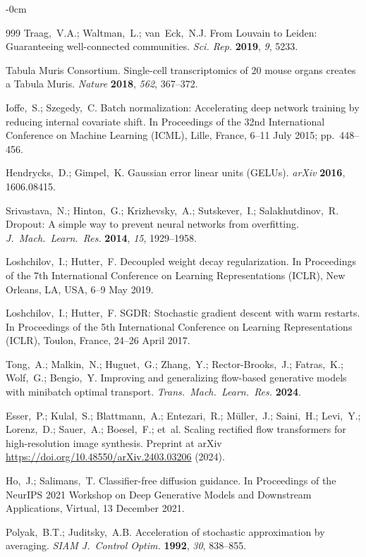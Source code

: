 \documentclass[11pt,a4paper]{article}
\newlength{\extralength}
\begin{document}
\begin{adjustwidth}{-\extralength}{0cm}
\begin{thebibliography}{999}
Traag,~V.A.; Waltman,~L.; van~Eck,~N.J. From Louvain to Leiden: Guaranteeing well-connected communities. {\em Sci. Rep.} {\bf 2019}, {\em 9}, 5233.

Tabula Muris Consortium. Single-cell transcriptomics of 20 mouse organs creates a Tabula Muris. {\em Nature} {\bf 2018}, {\em 562}, 367--372.

Ioffe,~S.; Szegedy,~C. Batch normalization: Accelerating deep network training by reducing internal covariate shift. In Proceedings of the 32nd International Conference on Machine Learning (ICML), Lille, France, 6--11 July 2015; pp.\ 448--456.

Hendrycks,~D.; Gimpel,~K. Gaussian error linear units (GELUs). {\em arXiv} {\bf 2016}, 1606.08415.

Srivastava,~N.; Hinton,~G.; Krizhevsky,~A.; Sutskever,~I.; Salakhutdinov,~R. Dropout: A simple way to prevent neural networks from overfitting. {\em J.\ Mach.\ Learn.\ Res.} {\bf 2014}, {\em 15}, 1929--1958.

Loshchilov,~I.; Hutter,~F. Decoupled weight decay regularization. In Proceedings of the 7th International Conference on Learning Representations (ICLR), New Orleans, LA, USA, 6--9 May 2019.

Loshchilov,~I.; Hutter,~F. SGDR: Stochastic gradient descent with warm restarts. In Proceedings of the 5th International Conference on Learning Representations (ICLR), Toulon, France, 24--26 April 2017.

Tong,~A.; Malkin,~N.; Huguet,~G.; Zhang,~Y.; Rector-Brooks,~J.; Fatras,~K.; Wolf,~G.; Bengio,~Y. Improving and generalizing flow-based generative models with minibatch optimal transport. {\em Trans.\ Mach.\ Learn.\ Res.} {\bf 2024}.

Esser,~P.; Kulal,~S.; Blattmann,~A.; Entezari,~R.; M\"{u}ller,~J.; Saini,~H.; Levi,~Y.; Lorenz,~D.; Sauer,~A.; Boesel,~F.; et~al. Scaling rectified flow transformers for high-resolution image synthesis. Preprint at arXiv \url{https://doi.org/10.48550/arXiv.2403.03206} (2024).

Ho,~J.; Salimans,~T. Classifier-free diffusion guidance. In Proceedings of the NeurIPS 2021 Workshop on Deep Generative Models and Downstream Applications, Virtual, 13 December 2021.

Polyak,~B.T.; Juditsky,~A.B. Acceleration of stochastic approximation by averaging. {\em SIAM J.\ Control Optim.} {\bf 1992}, {\em 30}, 838--855.


\end{thebibliography}
\end{adjustwidth}
\end{document}
